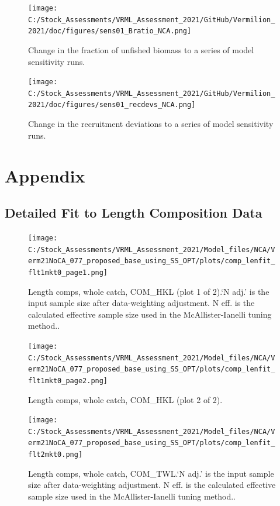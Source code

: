 \documentclass[
  english,
  a4paper,
]{article}
\begin{document}
\begin{figure}
\centering
\texttt{[image: C:/Stock\_Assessments/VRML\_Assessment\_2021/GitHub/Vermilion\_2021/doc/figures/sens01\_Bratio\_NCA.png]}
\caption{Change in the fraction of unfished biomass to a series of model sensitivity runs.\label{fig:sens1-bratio}}
\end{figure}

\begin{figure}
\centering
\texttt{[image: C:/Stock\_Assessments/VRML\_Assessment\_2021/GitHub/Vermilion\_2021/doc/figures/sens01\_recdevs\_NCA.png]}
\caption{Change in the recruitment deviations to a series of model sensitivity runs.\label{fig:sens1-recdev}}
\end{figure}

\clearpage

\hypertarget{appendix}{%
\section{Appendix}\label{appendix}}

\hypertarget{append-fit}{%
\subsection{Detailed Fit to Length Composition Data}\label{append-fit}}

\begin{figure}
\centering
\texttt{[image: C:/Stock\_Assessments/VRML\_Assessment\_2021/Model\_files/NCA/Verm21NoCA\_077\_proposed\_base\_using\_SS\_OPT/plots/comp\_lenfit\_flt1mkt0\_page1.png]}
\caption{Length comps, whole catch, COM\_HKL (plot 1 of 2).`N adj.' is the input sample size after data-weighting adjustment. N eff. is the calculated effective sample size used in the McAllister-Ianelli tuning method..\label{fig:comp_lenfit_flt1mkt0_page1}}
\end{figure}

\begin{figure}
\centering
\texttt{[image: C:/Stock\_Assessments/VRML\_Assessment\_2021/Model\_files/NCA/Verm21NoCA\_077\_proposed\_base\_using\_SS\_OPT/plots/comp\_lenfit\_flt1mkt0\_page2.png]}
\caption{Length comps, whole catch, COM\_HKL (plot 2 of 2).\label{fig:comp_lenfit_flt1mkt0_page2}}
\end{figure}

\begin{figure}
\centering
\texttt{[image: C:/Stock\_Assessments/VRML\_Assessment\_2021/Model\_files/NCA/Verm21NoCA\_077\_proposed\_base\_using\_SS\_OPT/plots/comp\_lenfit\_flt2mkt0.png]}
\caption{Length comps, whole catch, COM\_TWL.`N adj.' is the input sample size after data-weighting adjustment. N eff. is the calculated effective sample size used in the McAllister-Ianelli tuning method..\label{fig:comp_lenfit_flt2mkt0}}
\end{figure}
\end{document}
